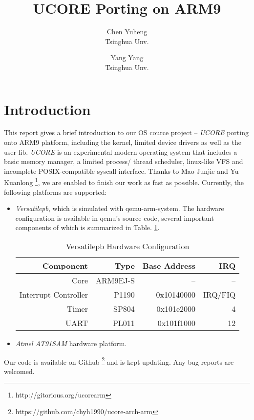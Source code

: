 \documentclass[a4paper]{article}
\begin{document}
\title{UCORE Porting on ARM9}
\author{Chen Yuheng\\ Tsinghua Unv. \and Yang Yang\\ Tsinghua Unv.}
\maketitle

\section{Introduction}
This report gives a brief introduction to our OS cource project -- 
\emph{UCORE} porting onto ARM9 platform, including the kernel, limited
device drivers as well as the user-lib. \emph{UCORE} is an experimental 
modern operating system that includes a basic memory manager, a limited process/
thread scheduler, linux-like VFS and incomplete POSIX-compatible syscall 
interface. Thanks to Mao Junjie
 and Yu Kuanlong
\footnote{http://gitorious.org/ucorearm}, we are enabled to finish our
 work as fast as possible. Currently, the following platforms are supported:
 \begin{itemize}
   \item \emph{Versatilepb}, which is simulated with qemu-arm-system.
     The hardware configuration is available in qemu's source code,
     several important components of which is summarized in
     Table. \ref{tab:versatile1}.
     \begin{table}[h]
       \centering
       \begin{tabular}{|r|rrr|}
         \hline
         Component & Type & Base Address &  IRQ \\
         \hline
         Core     &  ARM9EJ-S & -- & -- \\
         Interrupt Controller & P1190 & 0x10140000 & IRQ/FIQ \\
         Timer    &  SP804    & 0x101e2000 & 4 \\
         UART     &  PL011  & 0x101f1000 & 12  \\
         \hline
       \end{tabular}
       \caption{Versatilepb Hardware Configuration}
       \label{tab:versatile1}
     \end{table}

   \item \emph{Atmel AT91SAM} hardware platform.
 \end{itemize}

Our code is available on Github
\footnote{https://github.com/chyh1990/ucore-arch-arm}
 and is kept updating. Any bug reports are welcomed.
\end{document}

